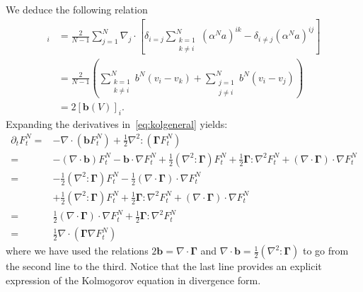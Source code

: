 \documentclass[11pt,a4paper]{article}
\theoremstyle{definition}
\theoremstyle{plain}
\newcommand{\bd}[1]{\mathbf{#1}}
\begin{document}
We deduce the following relation
\begin{align*}
    [\nabla\cdot\bd{\Gamma}]_{i}&=\frac{2}{N-1}\sum_{j=1}^N \nabla_j\cdot\left[ \delta_{i=j} \sum_{\substack{k=1\\k\neq i}}^N (\alpha^Na)^{ik} - \delta_{i\neq j}(\alpha^Na)^{ij} \right]\\
    &=\frac{2}{N-1}\left(\sum_{\substack{k=1\\k\neq i}}^N b^{N}(v_i-v_k) +\sum_{\substack{j=1\\j\neq i}}^N b^{N}(v_i-v_j) \right)\\
    &=2[\bd{b}(V)]_i.
\end{align*}
Expanding the derivatives in~\eqref{eq:kolgeneral} yields:
\begin{align}
    \partial_t F^N_t =& - \nabla \cdot (\bd{b} F^N_t) + \frac{1}{2}\nabla^2: (\bd{\Gamma} F^N_t)\nonumber\\
    =& - (\nabla \cdot \bd{b})F^N_t -  \bd{b} \cdot \nabla F^N_t + \frac{1}{2} (\nabla^2: \bd{\Gamma}) F^N_t + \frac{1}{2} \bd{\Gamma}:\nabla^2 F^N_t + (\nabla \cdot \bd{\Gamma})\cdot \nabla F_t^N\nonumber\\
    =& - \frac{1}{2}(\nabla^2: \bd{\Gamma})F^N_t -  \frac{1}{2} (\nabla \cdot \bd{\Gamma}) \cdot \nabla F^N_t\nonumber \\
    &+  \frac{1}{2}(\nabla^2: \bd{\Gamma})F^N_t + \frac{1}{2} \bd{\Gamma}:\nabla^2 F^N_t + (\nabla \cdot \bd{\Gamma})\cdot \nabla F_t^N\nonumber \\
    =& \frac{1}{2} (\nabla \cdot \bd{\Gamma}) \cdot \nabla F^N_t + \frac{1}{2} \bd{\Gamma}:\nabla^2 F^N_t \nonumber\\
    =& \frac{1}{2} \nabla \cdot (\bd{\Gamma} \nabla F^N_t)
\end{align}
where we have used the relations $2 \bd{b}=\nabla \cdot \bd{\Gamma}$ and $\nabla\cdot \bd{b}=\frac{1}{2}(\nabla^2: \bd{\Gamma})$ to go from the second line to the third. Notice that the last line provides an explicit expression of the Kolmogorov equation in divergence form.
\end{document}
